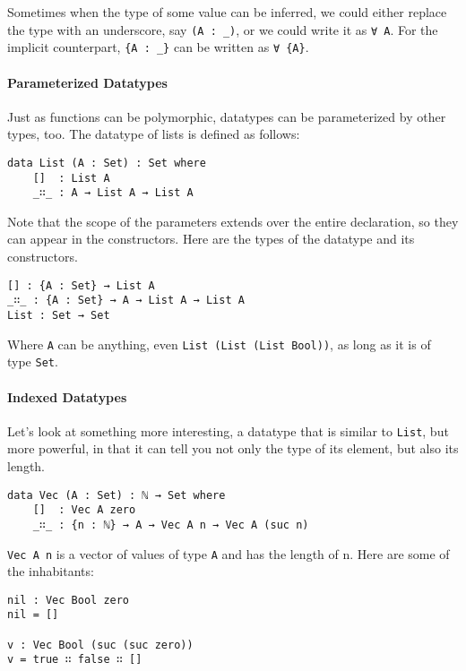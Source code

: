 \documentclass[12pt, a4paper]{article}
\begin{document}
Sometimes when the type of some value can be inferred, we could either replace
the type with an underscore, say {\lstinline|(A : _)|}, or we could write it as
{\lstinline|∀ A|}. For the implicit counterpart, {\lstinline|{A : _}|} can be
written as {\lstinline|∀ {A}|}.

\paragraph{Parameterized Datatypes}

Just as functions can be polymorphic, datatypes can be parameterized by other
types, too. The datatype of lists is defined as follows:

\begin{lstlisting}
data List (A : Set) : Set where
    []  : List A
    _∷_ : A → List A → List A
\end{lstlisting}

Note that the scope of the parameters extends over the entire declaration, so
they can appear in the constructors.
Here are the types of the datatype and its constructors.

\begin{lstlisting}
[] : {A : Set} → List A
_∷_ : {A : Set} → A → List A → List A
List : Set → Set
\end{lstlisting}

Where {\lstinline|A|} can be anything, even {\lstinline|List (List (List Bool))|},
as long as it is of type {\lstinline|Set|}.

\paragraph{Indexed Datatypes}

Let's look at something more interesting, a datatype that is similar to
{\lstinline|List|}, but more powerful, in that it can tell you not only the type
of its element, but also its length.

\begin{lstlisting}
data Vec (A : Set) : ℕ → Set where
    []  : Vec A zero
    _∷_ : {n : ℕ} → A → Vec A n → Vec A (suc n)
\end{lstlisting}

{\lstinline|Vec A n|} is a vector of values of type {\lstinline|A|} and
has the length of n. Here are some of the inhabitants:

\begin{lstlisting}
nil : Vec Bool zero
nil = []

v : Vec Bool (suc (suc zero))
v = true ∷ false ∷ []
\end{lstlisting}
\end{document}
